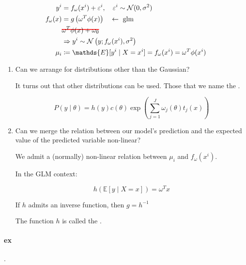 \begin{align*}
	y^i         & = f_\omega(x^i) + \varepsilon^i, \quad \varepsilon^i \sim \mathcal{N}(0, \sigma^2) \\
	f_\omega(x) & = g\left(\omega^T\phi(x)\right) \quad \leftarrow \text{ glm}                       \\
	            & \hcancel[red]{\omega^T\phi(x) + \omega_0}                                          \\
	            & \Rightarrow y^i \sim \mathcal{N}\left(y; f_\omega(x^i), \sigma^2\right)            \\
	\mu_i       & \coloneqq \mathds{E}[y^i  \mid X = x^i] = f_\omega(x^i) = \omega^T\phi(x^i)
\end{align*}

\begin{enumerate}
	\item Can we arrange for distributions other than the Gaussian?

	      It turns out that other distributions can be used. Those that
	      we name the .

	      \begin{equation*}
		      P(y \mid \theta) = h(y)c(\theta) \exp\left(\sum_{j=1}^J \omega_j(\theta)t_j(x)\right)
	      \end{equation*}

	\item Can we merge the relation between our model's prediction
	      and the expected value of the predicted variable non-linear?

	      We admit a (normally) non-linear relation between $\mu_i$ and $f_\omega(x^i)$.

	      In the GLM context:

	      \begin{equation*}
		      \boxed{
			      h\left(\mathds{E} [y \mid X = x] \right) = \omega^T x
		      }
	      \end{equation*}

	      If $h$ admits an inverse function, then $g = h^{-1}$

	      The function $h$ is called the .

\end{enumerate}

\paragraph{ex}.

